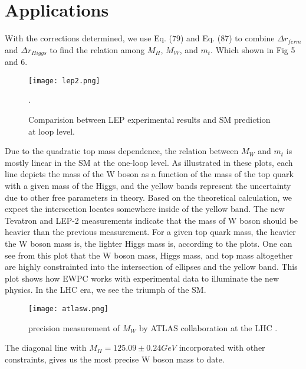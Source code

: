 \documentclass[secnumarabic, graphics,floatfix,nofootinbib,amsmath
tightenlines,nobibnotes,aps,prl,12pt]{revtex4-1}
\begin{document}
{\section{\label{sec:level1} Applications}
With the corrections determined, we use Eq. (79) and Eq. (87) to combine $\Delta r_{ferm}$ and $\Delta r_{Higgs}$ to find the relation among $M_H$, $M_W$, and $m_t$. Which shown in Fig 5 and 6.
\begin{figure}[ht!]
\center
\texttt{[image: lep2.png]}
\caption{Comparision between LEP experimental results and SM prediction at loop level.\cite{Schael:2013ita}}.
\end{figure}
Due to the quadratic top mass dependence, the relation between $M_W$ and $m_t$ is mostly linear in the SM at the one-loop level. As illustrated in these plots, each line depicts the mass of the W boson as a function of the mass of the top quark with a given mass of the Higgs, and the yellow bands represent the uncertainty due to other free parameters in theory. Based on the theoretical calculation, we expect the intersection locates somewhere inside of the yellow band. The new Tevatron and LEP-2 measurements indicate that the mass of W boson should be heavier than the previous measurement. For a given top quark mass, the heavier the W boson mass is, the lighter Higgs mass is, according to the plots.  One can see from this plot that the W boson mass, Higgs mass, and top mass altogether are highly constrainted into the intersection of ellipses and the yellow band. This plot shows how EWPC works with experimental data to illuminate the new physics. In the LHC era, we see the triumph of the SM.
\begin{figure}[ht!]
\center
\texttt{[image: atlasw.png]}
\caption{precision measurement of $M_W$  by ATLAS collaboration at the LHC .\cite{Aaboud:2017svj}}
\end{figure}
The diagonal line with $M_H=125.09\pm0.24GeV$ incorporated with other constraints, gives us the most precise W boson mass to date.



}
\end{document}
